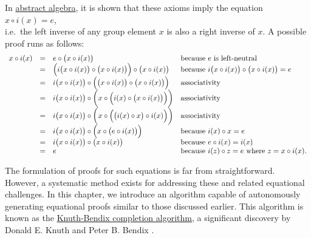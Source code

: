 In \href{https://en.wikipedia.org/wiki/Abstract_algebra}{abstract algebra}, it is shown that these axioms imply
the equation 
\\[0.2cm]
\hspace*{1.3cm}
$x \circ i(x) = e$, 
\\[0.2cm]
i.e.~the left inverse of any group element $x$ is also a right inverse of $x$.
A possible proof runs as follows:
$$
\begin{array}{lcll}
  x \circ i(x) & = & e \circ \bigl(x \circ i(x)\bigr) & \mbox{because $e$ is left-neutral} \\
               & = & \Bigl(i\bigl(x \circ i(x)\bigr) \circ \bigl(x \circ i(x)\bigr)\Bigr) \circ \bigl(x \circ i(x)\bigr)
                   & \mbox{because $i\bigl(x \circ i(x)\bigr) \circ \bigl(x \circ i(x)\bigr) = e$} \\
               & = & i\bigl(x \circ i(x)\bigr) \circ \Bigl(\bigl(x \circ i(x)\bigr) \circ \bigl(x \circ i(x)\bigr)\Bigr)
                   &  \mbox{associativity} \\
               & = & i\bigl(x \circ i(x)\bigr) \circ \biggl(x \circ \Bigl(i(x) \circ \bigl(x \circ i(x)\bigr)\Bigr)\biggr) 
                   &  \mbox{associativity} \\
               & = & i\bigl(x \circ i(x)\bigr) \circ \biggl(x \circ \Bigl(\bigl(i(x) \circ x\bigr) \circ i(x)\Bigr)\biggr) 
                   &  \mbox{associativity} \\
               & = & i\bigl(x \circ i(x)\bigr) \circ \Bigl(x \circ \bigl(e \circ i(x)\bigr)\Bigr) 
                   &  \mbox{because $i(x) \circ x = e$} \\
               & = & i\bigl(x \circ i(x)\bigr) \circ \bigl(x \circ i(x)\bigr) 
                   &  \mbox{because $e \circ i(x) = i(x)$} \\
               & = & e 
                   & \mbox{because $i(z) \circ z = e$ where $z = x \circ i(x)$.}
\end{array}
$$

The formulation of proofs for such equations is far from straightforward. However, a systematic method exists
for addressing these and related equational challenges. In this chapter, we introduce an algorithm capable of
autonomously generating equational proofs similar to those discussed earlier. This algorithm is known as
the \href{https://en.wikipedia.org/wiki/Knuth-Bendix_completion_algorithm}{Knuth-Bendix completion algorithm},
a significant discovery by Donald E. Knuth and Peter B. Bendix \cite{knuth:1970}. 

